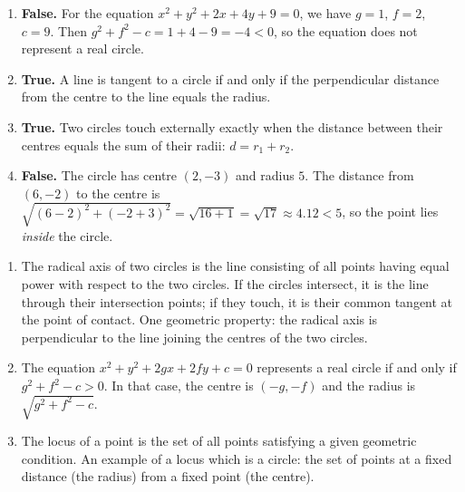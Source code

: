 \documentclass[11pt]{article}
\newcommand{\cle}[1]{{\popxbold\color{popdark}#1}}
\begin{document}
\begin{corrige}
\begin{enumerate}
\item \textbf{False.} For the equation $x^{2}+y^{2}+2x+4y+9=0$, we have $g=1$, $f=2$, $c=9$. Then $g^{2}+f^{2}-c=1+4-9=-4<0$, so the equation does not represent a real circle.
\item \textbf{True.} A line is tangent to a circle if and only if the perpendicular distance from the centre to the line equals the radius.
\item \textbf{True.} Two circles touch externally exactly when the distance between their centres equals the sum of their radii: $d=r_{1}+r_{2}$.
\item \textbf{False.} The circle has centre $(2,-3)$ and radius $5$. The distance from $(6,-2)$ to the centre is $\sqrt{(6-2)^{2}+(-2+3)^{2}}=\sqrt{16+1}=\sqrt{17}\approx 4.12<5$, so the point lies \emph{inside} the circle.
\end{enumerate}
\end{corrige}

\begin{corrige}
\begin{enumerate}
\item The \cle{radical axis} of two circles is the line consisting of all points having equal power with respect to the two circles. If the circles intersect, it is the line through their intersection points; if they touch, it is their common tangent at the point of contact. One geometric property: the radical axis is perpendicular to the line joining the centres of the two circles.
\item The equation $x^{2}+y^{2}+2gx+2fy+c=0$ represents a real circle if and only if $g^{2}+f^{2}-c>0$. In that case, the centre is $(-g,-f)$ and the radius is $\sqrt{g^{2}+f^{2}-c}$.
\item The \cle{locus} of a point is the set of all points satisfying a given geometric condition. An example of a locus which is a circle: the set of points at a fixed distance (the radius) from a fixed point (the centre).
\end{enumerate}
\end{corrige}
\end{document}
